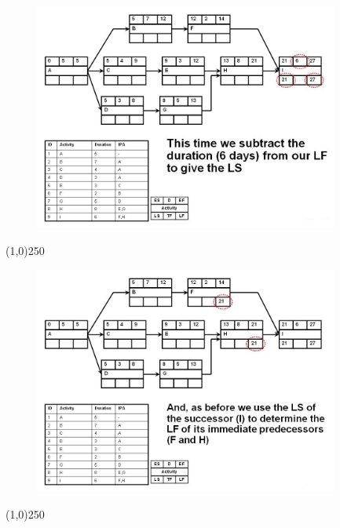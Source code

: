 \begin{frame}
\begin{figure}
	\centering
		\includegraphics[width = 10.0cm]{oldnotes/Slide152.jpg}
\end{figure}
\end{frame}
\begin{center}\line(1,0){250}\end{center}




\begin{frame}
\begin{figure}
	\centering
		\includegraphics[width = 10.0cm]{oldnotes/Slide153.jpg}
\end{figure}
\end{frame}
\begin{center}\line(1,0){250}\end{center}





